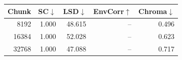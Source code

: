\begin{tabular}{rrrrr}
\toprule
Chunk & SC$\downarrow$ & LSD$\downarrow$ & EnvCorr$\uparrow$ & Chroma$\downarrow$ \\
\midrule
8192 & 1.000 & 48.615 & -- & 0.496 \\
16384 & 1.000 & 52.028 & -- & 0.623 \\
32768 & 1.000 & 47.088 & -- & 0.717 \\
\bottomrule
\end{tabular}
